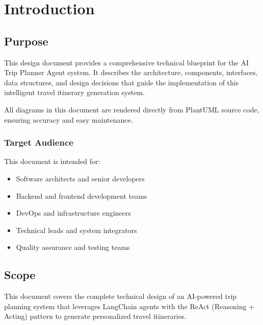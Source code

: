 \documentclass[12pt,a4paper]{report}
\begin{document}

\tableofcontents
\listoffigures
\listoftables


\chapter{Introduction}

\section{Purpose}

This design document provides a comprehensive technical blueprint for the AI Trip Planner Agent system. It describes the architecture, components, interfaces, data structures, and design decisions that guide the implementation of this intelligent travel itinerary generation system.

All diagrams in this document are rendered directly from PlantUML source code, ensuring accuracy and easy maintenance.

\subsection{Target Audience}

This document is intended for:

\begin{itemize}[leftmargin=*]
    \item Software architects and senior developers
    \item Backend and frontend development teams
    \item DevOps and infrastructure engineers
    \item Technical leads and system integrators
    \item Quality assurance and testing teams
\end{itemize}

\section{Scope}

This document covers the complete technical design of an AI-powered trip planning system that leverages LangChain agents with the ReAct (Reasoning + Acting) pattern to generate personalized travel itineraries.
\end{document}
